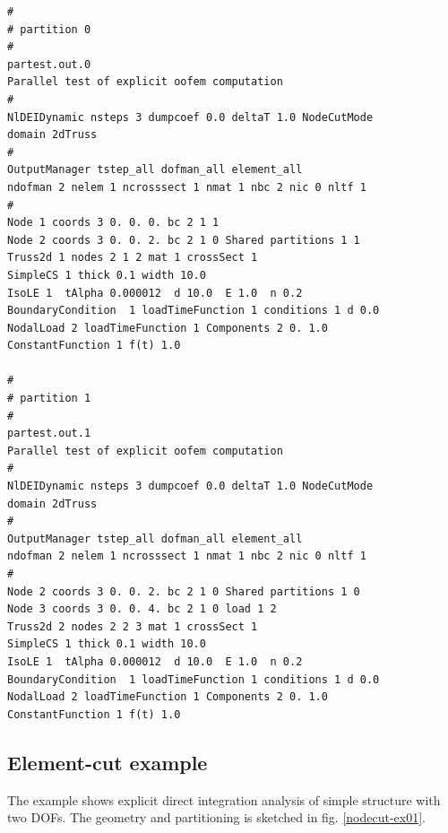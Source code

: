 \documentclass[a4paper]{article}
\begin{document}
\begin{verbatim}
#
# partition 0
#
partest.out.0
Parallel test of explicit oofem computation
#
NlDEIDynamic nsteps 3 dumpcoef 0.0 deltaT 1.0 NodeCutMode
domain 2dTruss
#
OutputManager tstep_all dofman_all element_all
ndofman 2 nelem 1 ncrosssect 1 nmat 1 nbc 2 nic 0 nltf 1
#
Node 1 coords 3 0. 0. 0. bc 2 1 1
Node 2 coords 3 0. 0. 2. bc 2 1 0 Shared partitions 1 1
Truss2d 1 nodes 2 1 2 mat 1 crossSect 1
SimpleCS 1 thick 0.1 width 10.0
IsoLE 1  tAlpha 0.000012  d 10.0  E 1.0  n 0.2
BoundaryCondition  1 loadTimeFunction 1 conditions 1 d 0.0
NodalLoad 2 loadTimeFunction 1 Components 2 0. 1.0
ConstantFunction 1 f(t) 1.0

#
# partition 1
#
partest.out.1
Parallel test of explicit oofem computation
#
NlDEIDynamic nsteps 3 dumpcoef 0.0 deltaT 1.0 NodeCutMode
domain 2dTruss
#
OutputManager tstep_all dofman_all element_all
ndofman 2 nelem 1 ncrosssect 1 nmat 1 nbc 2 nic 0 nltf 1
#
Node 2 coords 3 0. 0. 2. bc 2 1 0 Shared partitions 1 0
Node 3 coords 3 0. 0. 4. bc 2 1 0 load 1 2
Truss2d 2 nodes 2 2 3 mat 1 crossSect 1
SimpleCS 1 thick 0.1 width 10.0
IsoLE 1  tAlpha 0.000012  d 10.0  E 1.0  n 0.2
BoundaryCondition  1 loadTimeFunction 1 conditions 1 d 0.0
NodalLoad 2 loadTimeFunction 1 Components 2 0. 1.0
ConstantFunction 1 f(t) 1.0
\end{verbatim}

\subsection{Element-cut example}
The example shows explicit direct integration analysis of
simple structure with two DOFs. The geometry and partitioning is sketched in
fig. \ref{nodecut-ex01}.
\end{document}
